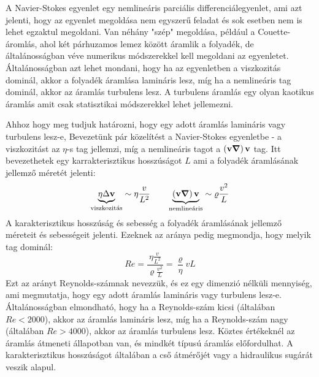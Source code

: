 \documentclass[a4paper,12pt]{article}
\begin{document}
A Navier-Stokes egyenlet egy nemlineáris parciális differenciálegyenlet, ami azt jelenti, hogy az egyenlet megoldása nem egyszerű feladat és sok esetben nem is lehet egzaktul megoldani.
Van néhány "szép" megoldása, például a Couette-áromlás, ahol két párhuzamos lemez között áramlik a folyadék, de általánosságban véve numerikus módszerekkel kell megoldani az egyenletet.
Általánosságban azt lehet mondani, hogy ha az egyenletben a viszkozitás dominál, akkor a folyadék áramlása lamináris lesz, míg ha a nemlineáris tag dominál, akkor az áramlás turbulens lesz.
A turbulens áramlás egy olyan kaotikus áramlás amit csak statisztikai módszerekkel lehet jellemezni. 

Ahhoz hogy meg tudjuk határozni, hogy egy adott áramlás lamináris vagy turbulens lesz-e,
Bevezetünk pár közelítést a Navier-Stokes egyenletbe - a viszkozitást az $\eta$-s tag jellemzi, míg a nemlineáris tagot a $\left(\bold{v} \boldsymbol{\nabla}\right)\bold{v}$ tag.
Itt bevezethetek egy karrakterisztikus hosszúságot $L$ ami a folyadék áramlásának jellemző méretét jelenti:
\begin{equation}
    \underbrace{\eta \Delta \bold{v}}_{\text{viszkozitás}} \sim \eta \frac{v}{L^2} \quad \quad \underbrace{\left(\bold{v} \boldsymbol{\nabla}\right)\bold{v}}_{\text{nemlineáris}} \sim \varrho \frac{v^2}{L}
\end{equation}
A karakterisztikus hosszúság és sebesség a folyadék áramlásának jellemző méreteit és sebességeit jelenti. Ezeknek az aránya pedig megmondja, hogy melyik tag dominál:
\begin{equation}
    Re = \frac{\eta \frac{v}{L^2}}{\varrho \frac{v^2}{L}} = \frac{\varrho}{\eta} v L
\end{equation}
Ezt az arányt Reynolds-számnak nevezzük, és ez egy dimenzió nélküli mennyiség, ami megmutatja, hogy egy adott áramlás lamináris vagy turbulens lesz-e.
Általánosságban elmondható, hogy ha a Reynolds-szám kicsi (általában $Re < 2000$), akkor az áramlás lamináris lesz, míg ha a Reynolds-szám nagy (általában $Re > 4000$), akkor az áramlás turbulens lesz.
Köztes értékeknél az áramlás átmeneti állapotban van, és mindkét típusú áramlás előfordulhat. A karakterisztikus hosszúságot általában a cső átmérőjét vagy a hidraulikus sugárát veszik alapul.
\end{document}
